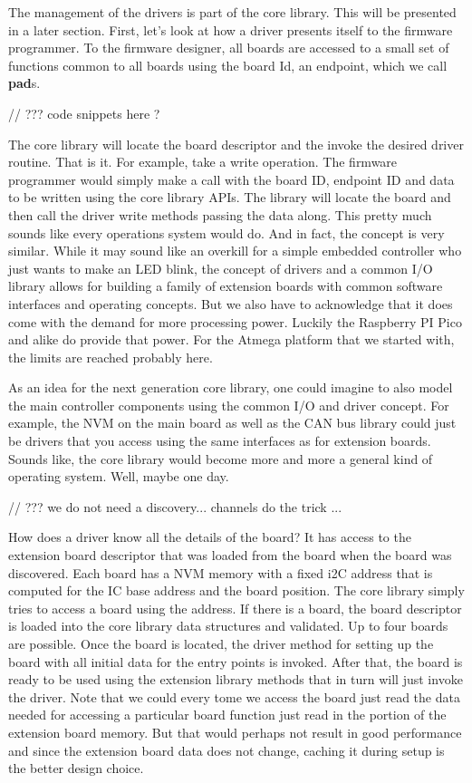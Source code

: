 The management of the drivers is part of the core library. This will be presented in a later section. First, let's look at how a driver presents itself to the firmware programmer. To the firmware designer, all boards are accessed to a small set of functions common to all boards using the board Id, an endpoint, which we call \textbf{pad}s.

// ??? code snippets here ?

The core library will locate the board descriptor and the invoke the desired driver routine. That is it. For example, take a write operation. The firmware programmer would simply make a call with the board ID, endpoint ID and data to be written using the core library APIs. The library will locate the board and then call the driver write methods passing the data along. This pretty much sounds like every operations system would do. And in fact, the concept is very similar. While it may sound like an overkill for a simple embedded controller who just wants to make an LED blink, the concept of drivers and a common I/O library allows for building a family of extension boards with common software interfaces and operating concepts. But we also have to acknowledge that it does come with the demand for more processing power. Luckily the Raspberry PI Pico and alike do provide that power. For the Atmega platform that we started with, the limits are reached probably here.

As an idea for the next generation core library, one could imagine to also model the main controller components using the common I/O and driver concept. For example, the NVM on the main board as well as the CAN bus library could just be drivers that you access using the same interfaces as for extension boards. Sounds like, the core library would become more and more a general kind of operating system. Well, maybe one day.


// ??? we do not need a discovery... channels do the trick ... 

How does a driver know all the details of the board? It has access to the extension board descriptor that was loaded from the board when the board was discovered. Each board has a NVM memory with a fixed i2C address that is computed for the IC base address and the board position. The core library simply tries to access a board using the address. If there is a board, the board descriptor is loaded into the core library data structures and validated. Up to four boards are possible. Once the board is located, the driver method for setting up the board with all initial data for the entry points is invoked. After that, the board is ready to be used using the extension library methods that in turn will just invoke the driver. Note that we could every tome we access the board just read the data needed for accessing a particular board function just read in the portion of the extension board memory. But that would perhaps not result in good performance and since the extension board data does not change, caching it during setup is the better design choice.


